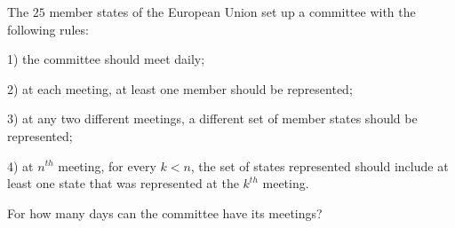 The $25$ member states of the European Union set up a committee with the following rules:

1) the committee should meet daily;

2) at each meeting, at least one member should be represented;

3) at any two different meetings, a different set of member states should be represented;

4) at $n^{th}$ meeting, for every $k<n$,  the set of states represented should include at least one state that was represented at the $k^{th}$ meeting.

For how many days can the committee have its meetings?